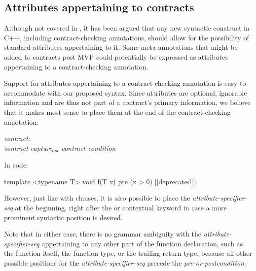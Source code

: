 
\subsection{Attributes appertaining to contracts}
\label{subsec:attr}

Although not covered in \cite{P2885R2}, it has been argued that any new syntactic construct in C++, including contract-checking annotations, should allow for the possibility of standard attributes appertaining to it. Some meta-annotations that might be added to contracts post MVP could potentially be expressed as attributes appertaining to a contract-checking annotation.

Support for attributes appertaining to a contract-checking annotation is easy to accommodate with our proposed syntax. Since attributes are optional, ignorable information and are thus not part of a contract's primary information, we believe that it makes most sense to place them at the end of the contract-checking annotation:

\begin{adjustwidth}{0.5cm}{0.5cm}

\emph{contract:} \\
\phantom{~~~}\emph{contract-capture}$_{opt}$ \emph{contract-condition} 

\end{adjustwidth}

In code:

\vspace{2mm}
\begin{codeblock}
template <typename T>
void f(T x)
  pre (x > 0) [[deprecated]];
\end{codeblock}
\vspace{2mm}

However, just like with  clauses, it is also possible to place the \emph{attribute-specifier-seq} at the beginning, right after the  or  contextual keyword in case a more prominent syntactic position is desired.

Note that in either case, there is no grammar ambiguity with the \emph{attribute-specifier-seq} appertaining to any other part of the function declaration, such as the function itself, the function type, or the trailing return type, because all other possible positions for the \emph{attribute-specifier-seq} precede the \emph{pre-or-postcondition}.

